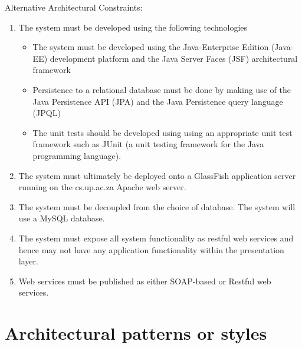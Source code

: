 \documentclass[12pt, oneside]{article}
\begin{document}
Alternative Architectural Constraints:
\begin{enumerate}
	\item The system must be developed using the following technologies
	\begin{itemize}
		\item The system must be developed using the Java-Enterprise Edition (Java-EE) development platform and the Java Server Faces (JSF) architectural framework
		\item Persistence to a relational database must be done by making use of the Java Persistence API (JPA) and the Java Persistence query language (JPQL)
		\item The unit tests should be developed using using an appropriate unit test framework such as JUnit (a unit testing framework for the Java programming language).
	\end{itemize}

	\item The system must ultimately be deployed onto a GlassFish application server running on the cs.up.ac.za Apache web server.
	\item The system must be decoupled from the choice of database. The system will use a MySQL database.
	\item The system must expose all system functionality as restful web services and hence may not have any application functionality within the presentation layer.
	\item Web services must be published as either SOAP-based or Restful web services.
\end{enumerate}
\section{Architectural patterns or styles}
\end{document}
